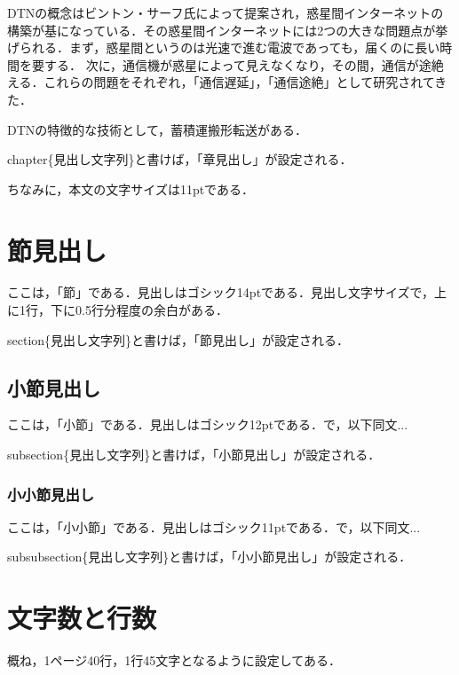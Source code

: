 \documentclass[11pt]{icsthesis}
\begin{document}
DTNの概念はビントン・サーフ氏によって提案され，惑星間インターネットの構築が基になっている．その惑星間インターネットには2つの大きな問題点が挙げられる．まず，惑星間というのは光速で進む電波であっても，届くのに長い時間を要する．
次に，通信機が惑星によって見えなくなり，その間，通信が途絶える．これらの問題をそれぞれ，「通信遅延」，「通信途絶」として研究されてきた．

DTNの特徴的な技術として，蓄積運搬形転送がある．

\textsf{\yen chapter\{見出し文字列\}}と書けば，「章見出し」が設定される．

ちなみに，本文の文字サイズは11ptである．

\section{節見出し}
ここは，「節」である．見出しはゴシック14ptである．見出し文字サイズで，上に1行，下に0.5行分程度の余白がある．

\textsf{\yen section\{見出し文字列\}}と書けば，「節見出し」が設定される．

\subsection{小節見出し}
ここは，「小節」である．見出しはゴシック12ptである．で，以下同文...

\textsf{\yen subsection\{見出し文字列\}}と書けば，「小節見出し」が設定される．

\subsubsection{小小節見出し}
ここは，「小小節」である．見出しはゴシック11ptである．で，以下同文...

\textsf{\yen subsubsection\{見出し文字列\}}と書けば，「小小節見出し」が設定される．

\section{文字数と行数}
概ね，1ページ40行，1行45文字となるように設定してある．


\end{document}
